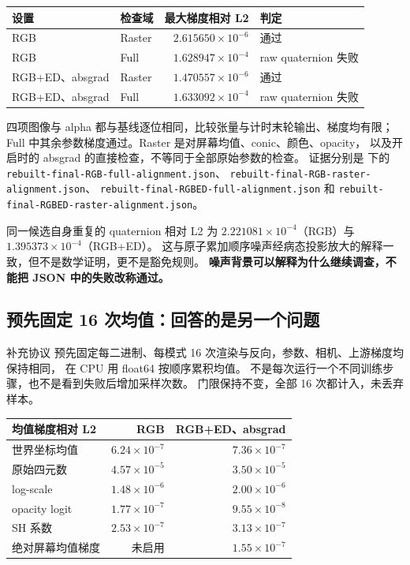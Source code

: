 \begin{center}
\small
\begin{tabular}{llrl}
\toprule
设置 & 检查域 & 最大梯度相对 L2 & 判定\\
\midrule
RGB & Raster & \(2.615650\times10^{-6}\) & 通过\\
RGB & Full   & \(1.628947\times10^{-4}\) & raw quaternion 失败\\
RGB+ED、absgrad & Raster & \(1.470557\times10^{-6}\) & 通过\\
RGB+ED、absgrad & Full   & \(1.633092\times10^{-4}\) & raw quaternion 失败\\
\bottomrule
\end{tabular}
\end{center}

四项图像与 alpha 都与基线逐位相同，比较张量与计时末轮输出、梯度均有限；
Full 中其余参数梯度通过。Raster 是对屏幕均值、conic、颜色、opacity，
以及开启时的 absgrad 的直接检查，不等同于全部原始参数的检查。
证据分别是  下的
\texttt{rebuilt-final-RGB-full-alignment.json}、
\texttt{rebuilt-final-RGB-raster-alignment.json}、
\texttt{rebuilt-final-RGBED-full-alignment.json} 和
\texttt{rebuilt-final-RGBED-raster-alignment.json}。

同一候选自身重复的 quaternion 相对 L2 为
\(2.221081\times10^{-4}\)（RGB）与
\(1.395373\times10^{-4}\)（RGB+ED）。
这与原子累加顺序噪声经病态投影放大的解释一致，但不是数学证明，更不是豁免规则。
\textbf{噪声背景可以解释为什么继续调查，不能把 JSON 中的失败改称通过。}

\subsection{预先固定 16 次均值：回答的是另一个问题}

补充协议 
预先固定每二进制、每模式 16 次渲染与反向，参数、相机、上游梯度均保持相同，
在 CPU 用 float64 按顺序累积均值。
不是每次运行一个不同训练步骤，也不是看到失败后增加采样次数。
门限保持不变，全部 16 次都计入，未丢弃样本。

\begin{center}
\small
\begin{tabular}{lrr}
\toprule
均值梯度相对 L2 & RGB & RGB+ED、absgrad\\
\midrule
世界坐标均值 & \(6.24\times10^{-7}\) & \(7.36\times10^{-7}\)\\
原始四元数 & \(4.57\times10^{-5}\) & \(3.50\times10^{-5}\)\\
log-scale & \(1.48\times10^{-6}\) & \(2.00\times10^{-6}\)\\
opacity logit & \(1.77\times10^{-7}\) & \(9.55\times10^{-8}\)\\
SH 系数 & \(2.53\times10^{-7}\) & \(3.13\times10^{-7}\)\\
绝对屏幕均值梯度 & 未启用 & \(1.55\times10^{-7}\)\\
\bottomrule
\end{tabular}
\end{center}

